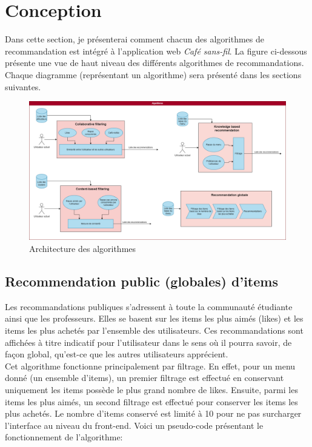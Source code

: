 \documentclass[11pt]{article}
\begin{document}
\section{Conception}
Dans cette section, je présenterai comment chacun des algorithmes de recommandation est intégré à l'application web \textit{Café sans-fil}. La figure ci-dessous présente une vue de haut niveau des différents algorithmes de recommandations. Chaque diagramme (représentant un algorithme) sera présenté dans les sections suivantes.
\begin{figure}[h]
%
\includegraphics[scale=0.3]{images/Pipeline.drawio.png} 
\caption{Architecture des algorithmes}
\end{figure}

\subsection{Recommendation public (globales) d'items}
Les recommandations publiques s'adressent à toute la communauté étudiante ainsi que les professeurs. Elles se basent sur les items les plus aimés (likes) et les items les plus achetés par l'ensemble des utilisateurs. Ces recommandations sont affichées à titre indicatif pour l'utilisateur dans le sens où il pourra savoir, de façon global, qu'est-ce que les autres utilisateurs apprécient.\\

Cet algorithme fonctionne principalement par filtrage. En effet, pour un menu donné (un ensemble d'items), un premier filtrage est effectué en conservant uniquement les items possède le plus grand nombre de likes. Ensuite, parmi les items les plus aimés, un second filtrage est effectué pour conserver les items les plus achetés. Le nombre d'items conservé est limité à 10 pour ne pas surcharger l'interface au niveau du front-end. Voici un pseudo-code présentant le fonctionnement de l'algorithme:
\end{document}
